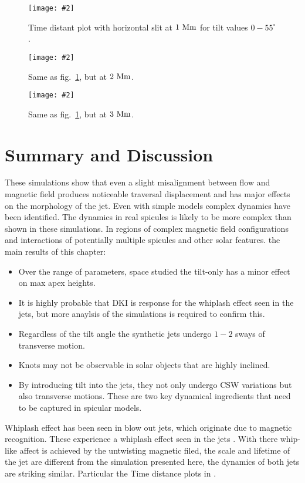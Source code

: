 \documentclass[12pt]{ociamthesis}
\newcommand{\mfig}[4]{
  \begin{figure}
  \begin{center}
  \texttt{[image: \#2]}
  \caption{#3}
  \label{#4}
  \end{center}
  \end{figure}}
\begin{document}
%
\mfig{1}{figures/td_plot_1Mm.png}{Time distant plot with horizontal slit at $1~\rm{Mm}$ for tilt values $0-55^{\circ}$.}{td_plot_1Mm}
%
\mfig{1}{figures/td_plot_2Mm.png}{Same as fig.~\ref{td_plot_1Mm}, but at $2~\rm{Mm}$.}{td_plot_2Mm}
\mfig{1}{figures/td_plot_3Mm.png}{Same as fig.~\ref{td_plot_1Mm}, but at $3~\rm{Mm}$.}{td_plot_3Mm}
\section{Summary and Discussion}
\label{sec:sum}
These simulations show that even a slight misalignment between flow and magnetic field produces noticeable traversal displacement and has major effects on the morphology of the jet. Even with simple models complex dynamics have been identified. The dynamics in real spicules is likely to be more complex than shown in these simulations. In regions of complex  magnetic field configurations and interactions of potentially multiple spicules and other solar features. the main results of this chapter: 
\begin{itemize}
\item Over the range of parameters, space studied the tilt-only has a minor effect on max apex heights.
\item It is highly probable that DKI is response for the whiplash effect seen in the jets, but more anaylsis of the simulations is required to confirm this.
\item Regardless of the tilt angle the synthetic jets undergo $1-2$ sways of transverse motion.
\item Knots may not be observable in solar objects that are highly inclined.
\item By introducing tilt into the jets, they not only undergo CSW variations but also transverse motions. These are two key dynamical ingredients that need to be captured in spicular models.
\end{itemize}
Whiplash effect has been seen in blow out jets, which originate due to magnetic recognition. These experience a whiplash effect seen in the jets \citep{Canfield1996ApJ4641016C,Liu2009ApJ707L37L}. With there whip-like affect is achieved by the untwisting magnetic filed, the scale and lifetime of the jet are different from the simulation presented here, the dynamics of both jets are striking similar. Particular the Time distance plots in \cite{Liu2009ApJ707L37L}.



  
\end{document}
